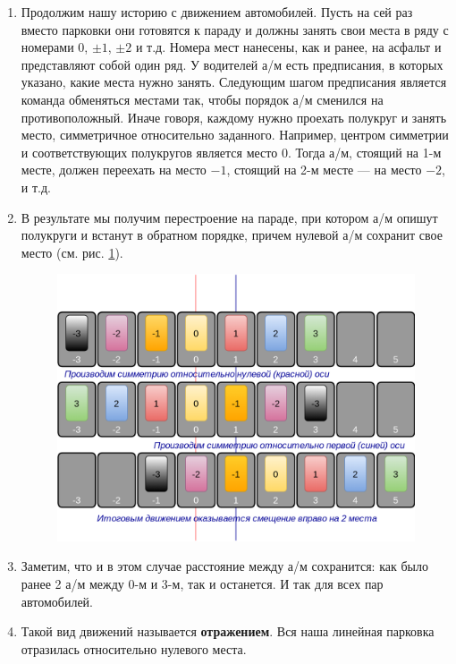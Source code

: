 

\begin{enumerate}
\item Продолжим нашу историю с движением автомобилей. Пусть на сей раз вместо парковки они готовятся к параду и должны занять свои места в ряду с номерами 0, $\pm 1$, $\pm 2$ и т.д. Номера мест нанесены, как и ранее, на асфальт и представляют собой один ряд. У водителей а/м есть предписания, в которых указано, какие места нужно занять. Следующим шагом предписания является команда обменяться местами так, чтобы порядок а/м сменился на противоположный. Иначе говоря, каждому нужно проехать полукруг и занять место, симметричное относительно заданного. Например, центром симметрии и соответствующих полукругов является место 0. Тогда а/м, стоящий на 1-м месте, должен переехать на место $-1$, стоящий на 2-м месте --- на место $-2$, и т.д.
\item В результате мы получим перестроение на параде, при котором а/м опишут полукруги и встанут в обратном порядке, причем нулевой а/м сохранит свое место (см. рис. \ref{SST}).
\begin{figure}[hbt!]
\begin{center}
\includegraphics[scale=0.3]{SST.png}
\end{center}
\caption{}\label{SST}
\end{figure}
\item Заметим, что и в этом случае расстояние между а/м сохранится: как было ранее 2 а/м между 0-м и 3-м, так и останется. И так для всех пар автомобилей.
\item Такой вид движений называется \textbf{отражением}. Вся наша линейная парковка отразилась относительно нулевого места.

\end{enumerate}
